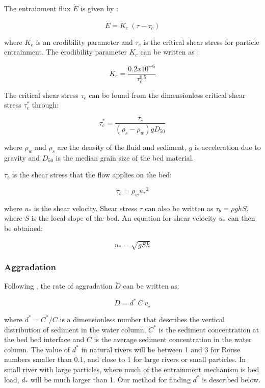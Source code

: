 \documentclass[10pt]{article}
\begin{document}
The entrainment flux $\dot{E}$ is given by \citep[e.g.,][]{hanson1990surface}:

\begin{equation}
\dot{E} = K_e \: (\tau - {\tau_c})
\end{equation}

\noindent where $K_e$ is an erodibility parameter and ${\tau_c}$ is the critical shear stress for particle entrainment. The erodibility parameter $K_e$ can be written as \citep{hanson2001erodibility}:
 
\begin{equation}
K_e = \frac{0.2 x 10^{-6}}{\tau_c^{0.5}}
\end{equation}

The critical shear stress ${\tau_c}$ can be found from the dimensionless critical shear stress ${\tau^*_c}$ through:

\begin{equation}
\tau^*_c = \frac{\tau_c}{(\rho_s - \rho_w) g D_{50}}
\end{equation}

\noindent where $\rho_w$ and $\rho_s$ are the density of the fluid and sediment, $g$ is acceleration due to gravity and $D_{50}$ is the median grain size of the bed material.
 
$\tau_b$ is the shear stress that the flow applies on the bed:

\begin{equation}
\tau_b = \rho_w {u_*}^2
\end{equation}

\noindent where $u_*$ is the shear velocity. Shear stress $\tau$ can also be written as $\tau_b = \rho g h S$, where $S$ is the local slope of the bed. An equation for shear velocity $u_*$ can then be obtained:

\begin{equation}
u_* = \sqrt{g S h}
\end{equation}

\subsubsection{Aggradation}

Following \citet{davy2009fluvial}, the rate of aggradation $\dot{D}$ can be written as:

\begin{equation}
\dot{D} = d^* \: C \: v_s
\end{equation}

\noindent where $d^* = C^* / C$ is a dimensionless number that describes the vertical distribution of sediment in the water column, $C^*$ is the sediment concentration at the bed bed interface and $C$ is the average sediment concentration in the water column. The value of $d^*$ in natural rivers will be between 1 and 3 for Rouse numbers smaller than 0.1, and close to 1 for large rivers or small particles. In small river with large particles, where much of the entrainment mechanism is bed load, $d_*$ will be much larger than 1. Our method for finding $d^*$ is described below.
\end{document}
